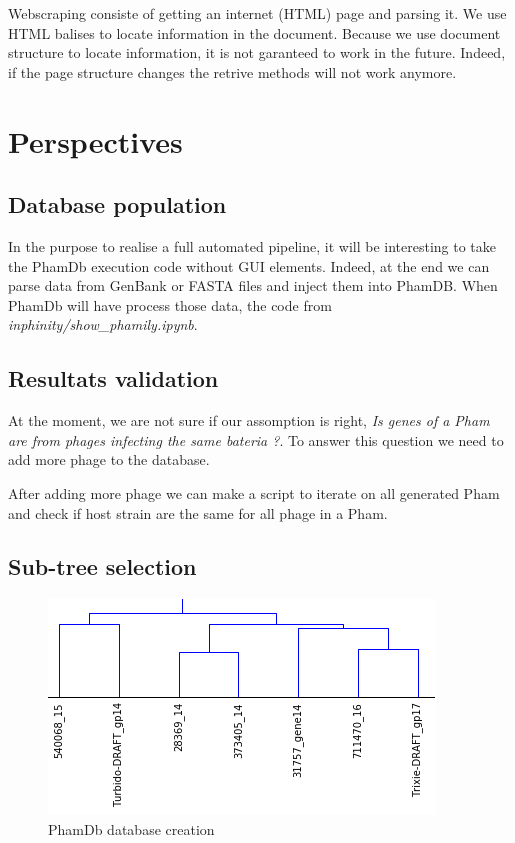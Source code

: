 \documentclass[a4paper,11pt]{report}
\begin{document}
Webscraping consiste of getting an internet (HTML) page and parsing it. We use HTML balises to locate information in the document. Because we use document structure to locate information, it is not garanteed to work in the future. Indeed, if the page structure changes the retrive methods will not work anymore.

\section{Perspectives}
\subsection{Database population}

In the purpose to realise a full automated pipeline, it will be interesting to take the PhamDb execution code without GUI elements. Indeed, at the end we can parse data from GenBank or FASTA files and inject them into PhamDB. When PhamDb will have process those data, the code from \textit{inphinity/show\_phamily.ipynb}.

\subsection{Resultats validation}

At the moment, we are not sure if our assomption is right, \textit{Is genes of a Pham are from phages infecting the same bateria ?}. To answer this question we need to add more phage to the database.

After adding more phage we can make a script to iterate on all generated Pham and check if host strain are the same for all phage in a Pham.

\subsection{Sub-tree selection}
\begin{figure}[H] 
	\begin{center}
		\includegraphics[scale=0.7]{img/tree_fig_4}
		\caption{PhamDb database creation}
	\end{center}
\end{figure}
\end{document}
